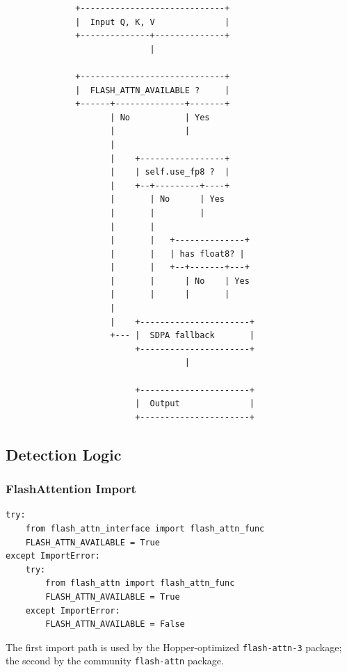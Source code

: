 \begin{lstlisting}
              +-----------------------------+
              |  Input Q, K, V              |
              +--------------+--------------+
                             |
                              
              +-----------------------------+
              |  FLASH_ATTN_AVAILABLE ?     |
              +------+--------------+-------+
                     | No           | Yes
                     |              |
                     |               
                     |    +-----------------+
                     |    | self.use_fp8 ?  |
                     |    +--+---------+----+
                     |       | No      | Yes
                     |       |         |
                     |       |          
                     |       |   +--------------+
                     |       |   | has float8? |
                     |       |   +--+-------+---+
                     |       |      | No    | Yes
                     |       |      |       |
                     |                       
                     |    +----------------------+
                     +--- |  SDPA fallback       |
                          +----------------------+
                                    |
                                     
                          +----------------------+
                          |  Output              |
                          +----------------------+
\end{lstlisting}

\subsection{Detection Logic}

\subsubsection{FlashAttention Import}

\begin{lstlisting}
try:
    from flash_attn_interface import flash_attn_func
    FLASH_ATTN_AVAILABLE = True
except ImportError:
    try:
        from flash_attn import flash_attn_func
        FLASH_ATTN_AVAILABLE = True
    except ImportError:
        FLASH_ATTN_AVAILABLE = False
\end{lstlisting}

The first import path is used by the Hopper-optimized \texttt{flash-attn-3} package; 
the second by the community \texttt{flash-attn} package.

